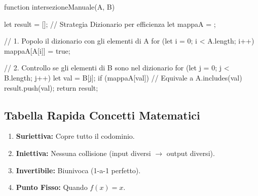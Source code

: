 \begin{jsbox}
function intersezioneManuale(A, B) {
    let result = [];
    // Strategia Dizionario per efficienza
    let mappaA = {};
    
    // 1. Popolo il dizionario con gli elementi di A
    for (let i = 0; i < A.length; i++) {
        mappaA[A[i]] = true;
    }
    
    // 2. Controllo se gli elementi di B sono nel dizionario
    for (let j = 0; j < B.length; j++) {
        let val = B[j];
        if (mappaA[val]) { // Equivale a A.includes(val)
            result.push(val);
        }
    }
    return result;
}
\end{jsbox}

\subsection{Tabella Rapida Concetti Matematici}
\begin{enumerate}
    \item \textbf{Suriettiva:} Copre tutto il codominio.
    \item \textbf{Iniettiva:} Nessuna collisione (input diversi $\to$ output diversi).
    \item \textbf{Invertibile:} Biunivoca (1-a-1 perfetto).
    \item \textbf{Punto Fisso:} Quando $f(x) = x$.
\end{enumerate}
